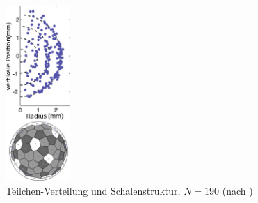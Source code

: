           \begin{figure}
            \centering
            \includegraphics[width=0.22\textwidth,height=0.55\textwidth]{figs/yukawaballN190.png}
            \caption{Teilchen-Verteilung und Schalenstruktur, $N=190$ (nach \cite{Arp04})}\label{img:strukturN190}
            \vspace{-0.5cm}
          \end{figure}

